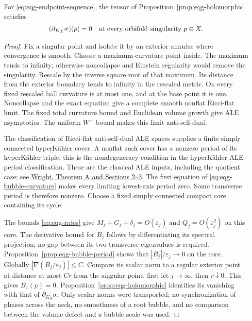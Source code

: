 \begin{corollary}
\label{cor:eqg-all-points}
For \eqref{eq:eqg-endpoint-sequence}, the tensor of
Proposition~\ref{prop:eqg-holomorphic} satisfies
\[
 (\partial_{K_X}\sigma)(p)=0
 \quad\hbox{at every orbifold singularity }p\in X.
\]
\end{corollary}

\begin{proof}
Fix a singular point and isolate it by an exterior annulus where
convergence is smooth.  Choose a maximum-curvature point inside.
The maximum tends to infinity; otherwise noncollapse and Einstein
regularity would remove the singularity.  Rescale by the inverse
square root of that maximum.  Its distance from the exterior boundary
tends to infinity in the rescaled metric.  On every fixed rescaled
ball curvature is at most one, and at the base point it is one.
Noncollapse and the exact equation give a complete smooth nonflat
Ricci-flat limit.  The fixed total curvature bound and Euclidean
volume growth give ALE asymptotics.  The uniform $W^+$ bound makes
this limit anti-self-dual.

The classification of Ricci-flat anti-self-dual ALE spaces supplies
a finite simply connected hyperKähler cover.  A nonflat such cover
has a nonzero period of its hyperKähler triple; this is the
nondegeneracy condition in the hyperKähler ALE period classification.
These are the classical ALE inputs, including the quotient case;
see \href{https://arxiv.org/pdf/1102.2442}{Wright, Theorem A and
Sections 2--3}.  The first equation of
\eqref{eq:eqg-bubble-curvature} makes every limiting lowest-axis
period zero.  Some transverse period is therefore nonzero.
Choose a fixed simply connected compact core containing its cycle.

The bounds \eqref{eq:eqg-rates} give
$M_j+G_j+\delta_j=O(\varepsilon_j)$ and
$Q_j=O(\varepsilon_j^2)$ on this core.  The derivative bound for
$B_j$ follows by differentiating its spectral projection; no gap
between its two transverse eigenvalues is required.
Proposition~\ref{prop:eqg-bubble-period} shows that
$|B_j|/\varepsilon_j\to0$ on the core.
Globally $|\nabla(B_j/\varepsilon_j)|\leq C$.
Compare its scalar norm to a regular exterior point at distance
at most $Cr$ from the singular point, first let $j\to\infty$,
then $r\downarrow0$.  This gives $B_1(p)=0$.
Proposition~\ref{prop:eqg-holomorphic} identifies its vanishing with
that of $\partial_{K_X}\sigma$.
Only scalar norms were transported; no synchronization of phases
across the neck, no smoothness of a root bubble, and no comparison
between the volume defect and a bubble scale was used.
\end{proof}

